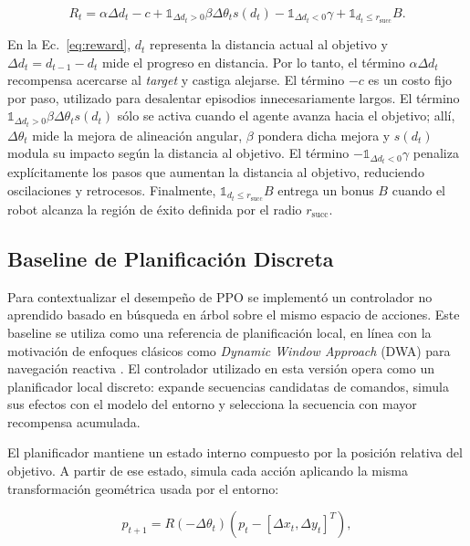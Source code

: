 \documentclass[conference]{IEEEtran}
\begin{document}
\begin{equation}
    R_t =
    \alpha \Delta d_t
    - c
    + \mathbb{1}_{\Delta d_t > 0}\beta \Delta \theta_t s(d_t)
    - \mathbb{1}_{\Delta d_t < 0}\gamma
    + \mathbb{1}_{d_t \leq r_{\text{succ}}}B .
    \label{eq:reward}
\end{equation}

En la Ec.~\ref{eq:reward}, $d_t$ representa la distancia actual al objetivo y $\Delta d_t=d_{t-1}-d_t$ mide el progreso en distancia. Por lo tanto, el término $\alpha\Delta d_t$ recompensa acercarse al \textit{target} y castiga alejarse. El término $-c$ es un costo fijo por paso, utilizado para desalentar episodios innecesariamente largos. El término $\mathbb{1}_{\Delta d_t > 0}\beta \Delta \theta_t s(d_t)$ sólo se activa cuando el agente avanza hacia el objetivo; allí, $\Delta \theta_t$ mide la mejora de alineación angular, $\beta$ pondera dicha mejora y $s(d_t)$ modula su impacto según la distancia al objetivo. El término $-\mathbb{1}_{\Delta d_t < 0}\gamma$ penaliza explícitamente los pasos que aumentan la distancia al objetivo, reduciendo oscilaciones y retrocesos. Finalmente, $\mathbb{1}_{d_t \leq r_{\text{succ}}}B$ entrega un bonus $B$ cuando el robot alcanza la región de éxito definida por el radio $r_{\text{succ}}$.

\subsection{Baseline de Planificación Discreta}
Para contextualizar el desempeño de PPO se implementó un controlador no aprendido basado en búsqueda en árbol sobre el mismo espacio de acciones. Este baseline se utiliza como una referencia de planificación local, en línea con la motivación de enfoques clásicos como \textit{Dynamic Window Approach} (DWA) para navegación reactiva \cite{dwa}. El controlador utilizado en esta versión opera como un planificador local discreto: expande secuencias candidatas de comandos, simula sus efectos con el modelo del entorno y selecciona la secuencia con mayor recompensa acumulada.

El planificador mantiene un estado interno compuesto por la posición relativa del objetivo. A partir de ese estado, simula cada acción aplicando la misma transformación geométrica usada por el entorno:

\begin{equation}
    p_{t+1} = R(-\Delta\theta_t)(p_t - [\Delta x_t,\Delta y_t]^T),
    \label{eq:baseline-transform}
\end{equation}
\end{document}
